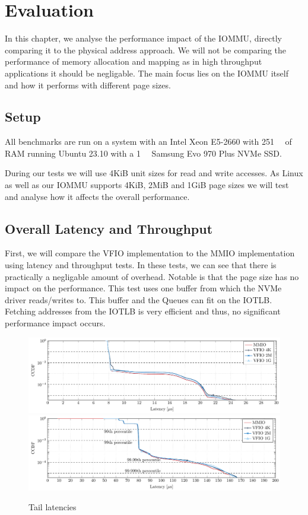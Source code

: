 \chapter{Evaluation}
In this chapter, we analyse the performance impact of the IOMMU, directly comparing it to the physical address approach. We will not be comparing the performance of memory allocation and mapping as in high throughput applications it should be negligable. The main focus lies on the IOMMU itself and how it performs with different page sizes.

\section{Setup}
All benchmarks are run on a system with an Intel Xeon E5-2660 with \qty{251}{\gibi\byte} of RAM running Ubuntu 23.10 with a \qty{1}{\tera\byte} Samsung Evo 970 Plus NVMe SSD.

During our tests we will use 4KiB unit sizes for read and write accesses.
As Linux as well as our IOMMU supports 4KiB, 2MiB and 1GiB page sizes we will test and analyse how it affects the overall performance.

\section{Overall Latency and Throughput}
First, we will compare the VFIO implementation to the MMIO implementation using latency and throughput tests. In these tests, we can see that there is practically a negligable amount of overhead. Notable is that the page size has no impact on the performance.
This test uses one buffer from which the NVMe driver reads/writes to. This buffer and the Queues can fit on the IOTLB. Fetching addresses from the IOTLB is very efficient and thus, no significant performance impact occurs.

\begin{figure}
    \centering
     {\includegraphics[width=\textwidth]{figures/latency_ccdf_write} \label{fig:ccdf-write}}
     {\includegraphics[width=\textwidth]{figures/latency_ccdf_read} \label{fig:ccdf-read}}
    \caption{Tail latencies}
    \label{fig:ccdf}
\end{figure}

